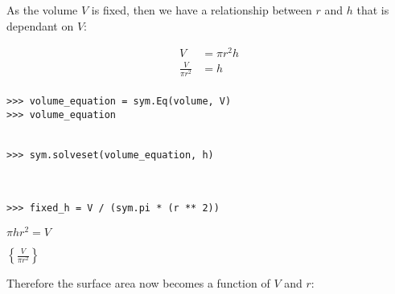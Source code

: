 \documentclass[12pt]{article}
\begin{document}
\begin{mdframed}[linewidth=0.5mm, backgroundcolor=orange!10]
As the volume $V$ is fixed, then we have a relationship between $r$ and $h$ that is dependant on $V$:
\end{mdframed}

\begin{minipage}[t]{.37\textwidth} %
\begin{mdframed}[linewidth=0.5mm, backgroundcolor=cyan!10]
\begin{align*}
V &= \pi r^2 h \\
\frac{V}{\pi r^2} &= h \\
\end{align*}
\vspace{0.8cm}
\end{mdframed}
\end{minipage} %
\begin{minipage}[t]{.63\textwidth} %
\begin{verbatim}
>>> volume_equation = sym.Eq(volume, V)
>>> volume_equation


>>> sym.solveset(volume_equation, h)



>>> fixed_h = V / (sym.pi * (r ** 2))
\end{verbatim}
\vspace{-4.125cm}

\hspace{0.5cm}\begin{minipage}{3cm}$\pi h r^2 = V$\end{minipage}

\vspace{1cm}

\hspace{0.5cm}\begin{minipage}{3cm}$\displaystyle{\left\{\frac{V}{\pi r^2}\right\}}$\end{minipage}
\end{minipage}

\vspace{0.5cm}

\begin{mdframed}[linewidth=0.5mm, backgroundcolor=orange!10]
Therefore the surface area now becomes a function of $V$ and $r$:
\end{mdframed}
\end{document}
